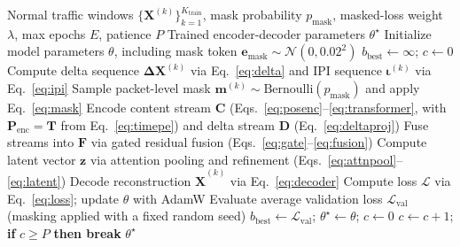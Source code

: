 \begin{algorithm}[!t]
\caption{Self-Supervised Dual-Stream Masked Reconstruction Training}
\label{alg:training}
\begin{algorithmic}[1]
\REQUIRE Normal traffic windows $\{\mathbf{X}^{(k)}\}_{k=1}^{K_{\text{train}}}$, mask probability $p_{\text{mask}}$, masked-loss weight $\lambda$, max epochs $E$, patience $P$
\ENSURE Trained encoder-decoder parameters $\theta^\star$
\STATE Initialize model parameters $\theta$, including mask token $\mathbf{e}_{\text{mask}} \sim \mathcal{N}(0, 0.02^2)$
\STATE $b_{\text{best}} \gets \infty$; $c \gets 0$
        \STATE Compute delta sequence $\mathbf{\Delta X}^{(k)}$ via Eq.~\eqref{eq:delta} and IPI sequence $\boldsymbol{\iota}^{(k)}$ via Eq.~\eqref{eq:ipi}
        \STATE Sample packet-level mask $\mathbf{m}^{(k)} \sim \text{Bernoulli}(p_{\text{mask}})$ and apply Eq.~\eqref{eq:mask}
        \STATE Encode content stream $\mathbf{C}$ (Eqs.~\eqref{eq:posenc}--\eqref{eq:transformer}, with $\mathbf{P}_{\text{enc}} = \mathbf{T}$ from Eq.~\eqref{eq:timepe}) and delta stream $\mathbf{D}$ (Eq.~\eqref{eq:deltaproj})
        \STATE Fuse streams into $\mathbf{F}$ via gated residual fusion (Eqs.~\eqref{eq:gate}--\eqref{eq:fusion})
        \STATE Compute latent vector $\mathbf{z}$ via attention pooling and refinement (Eqs.~\eqref{eq:attnpool}--\eqref{eq:latent})
        \STATE Decode reconstruction $\hat{\mathbf{X}}^{(k)}$ via Eq.~\eqref{eq:decoder}
        \STATE Compute loss $\mathcal{L}$ via Eq.~\eqref{eq:loss}; update $\theta$ with AdamW
    \ENDFOR
    \STATE Evaluate average validation loss $\mathcal{L}_{\text{val}}$ (masking applied with a fixed random seed)
        \STATE $b_{\text{best}} \gets \mathcal{L}_{\text{val}}$; $\theta^\star \gets \theta$; $c \gets 0$
    \ELSE
        \STATE $c \gets c + 1$; \textbf{if} $c \geq P$ \textbf{then break}
    \ENDIF
\ENDFOR
\RETURN $\theta^\star$
\end{algorithmic}
\end{algorithm}

